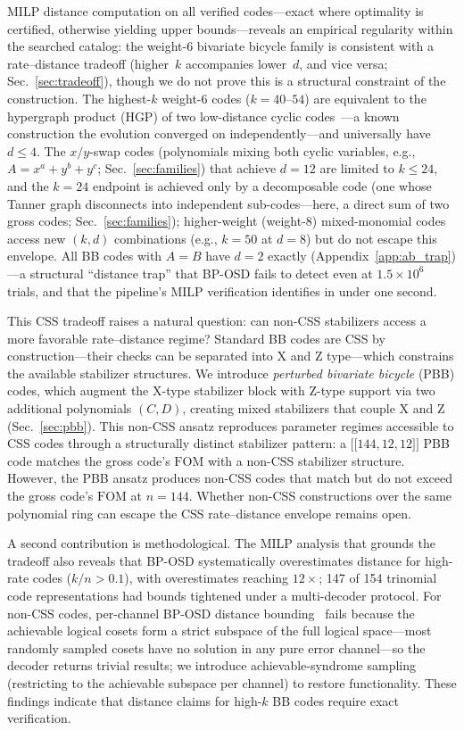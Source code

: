\documentclass[aps,prxquantum,twocolumn,superscriptaddress,nofootinbib]{revtex4-2}
\newcommand{\dblbrk}[1]{\ensuremath{\lbrack\!\lbrack #1 \rbrack\!\rbrack}}
\newcommand{\code}[1]{\dblbrk{#1}}
\newcommand{\FOM}{\ensuremath{\mathrm{FOM}}}
\begin{document}
MILP distance computation on all verified codes---exact where optimality is certified, otherwise yielding upper bounds---reveals an empirical regularity within the searched catalog: the weight-6 bivariate bicycle family is consistent with a rate--distance tradeoff (higher~$k$ accompanies lower~$d$, and vice versa; Sec.~\ref{sec:tradeoff}), though we do not prove this is a structural constraint of the construction.
The highest-$k$ weight-6 codes ($k = 40$--$54$) are equivalent to the hypergraph product (HGP) of two low-distance cyclic codes~\cite{eberhardt2024pruning,aydin2025cxc}---a known construction the evolution converged on independently---and universally have $d \leq 4$.
The $x/y$-swap codes (polynomials mixing both cyclic variables, e.g., $A = x^a{+}y^b{+}y^c$; Sec.~\ref{sec:families}) that achieve $d = 12$ are limited to $k \leq 24$, and the $k = 24$ endpoint is achieved only by a decomposable code (one whose Tanner graph disconnects into independent sub-codes---here, a direct sum of two gross codes; Sec.~\ref{sec:families}); higher-weight (weight-8) mixed-monomial codes access new $(k,d)$ combinations (e.g., $k = 50$ at $d = 8$) but do not escape this envelope.
All BB codes with $A = B$ have $d = 2$ exactly (Appendix~\ref{app:ab_trap})---a structural ``distance trap'' that BP-OSD fails to detect even at $1.5 \times 10^6$ trials, and that the pipeline's MILP verification identifies in under one second.

This CSS tradeoff raises a natural question: can non-CSS stabilizers access a more favorable rate--distance regime?
Standard BB codes are CSS by construction---their checks can be separated into X and Z type---which constrains the available stabilizer structures.
We introduce \emph{perturbed bivariate bicycle} (PBB) codes, which augment the X-type stabilizer block with Z-type support via two additional polynomials $(C, D)$, creating mixed stabilizers that couple X and Z (Sec.~\ref{sec:pbb}).
This non-CSS ansatz reproduces parameter regimes accessible to CSS codes through a structurally distinct stabilizer pattern: a $\code{144,12,12}$ PBB code matches the gross code's $\FOM$ with a non-CSS stabilizer structure.
However, the PBB ansatz produces non-CSS codes that match but do not exceed the gross code's $\FOM$ at $n = 144$. Whether non-CSS constructions over the same polynomial ring can escape the CSS rate--distance envelope remains open.

A second contribution is methodological.
The MILP analysis that grounds the tradeoff also reveals that BP-OSD systematically overestimates distance for high-rate codes ($k/n > 0.1$), with overestimates reaching $12\times$; 147 of 154 trinomial code representations had bounds tightened under a multi-decoder protocol.
For non-CSS codes, per-channel BP-OSD distance bounding~\cite{bravyi2024high} fails because the achievable logical cosets form a strict subspace of the full logical space---most randomly sampled cosets have no solution in any pure error channel---so the decoder returns trivial results; we introduce achievable-syndrome sampling (restricting to the achievable subspace per channel) to restore functionality.
These findings indicate that distance claims for high-$k$ BB codes require exact verification.
\end{document}
